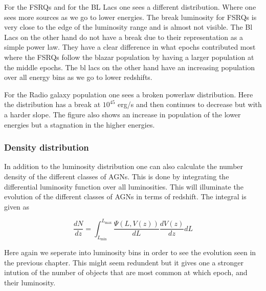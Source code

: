 \documentclass{article}
\begin{document}
For the FSRQs and for the BL Lacs one sees a different distribution. Where one sees more sources as we go to lower energies. The break luminosity for FSRQs 
is very close to the edge of the luminosity range and is almost not visible. The Bl Lacs on the other hand do not have a break 
due to their representation as a simple power law. They have a clear difference in what epochs contributed most where the FSRQs follow the blazar population by having a larger population at the 
middle epochs. The bl lacs on the other hand have an increasing population over all energy bins as we go to lower redshifts.

For the Radio galaxy population one sees a broken powerlaw distribution. Here the distribution has a break at $10^{45}$ erg/s and then continues to 
decrease but with a harder slope. The figure also shows an increase in population of the lower energies but a stagnation in the higher energies. 


\subsubsection{Density distribution}

In addition to the luminosity distribution one can also calculate the number density of the different classes of AGNs. This is done by integrating the
differential luminosity function over all luminosities. This will illuminate the evolution of the different classes of AGNs in terms of redshift. The integral is given as

\begin{equation}
    \frac{dN}{dz} = \int_{L_{\text{min}}}^{L_{\text{max}}} \frac{\Psi(L, V(z))}{dL} \frac{dV(z)}{dz} dL
\end{equation}

Here again we seperate into luminosity bins in order to see the evolution seen in the previous chapter. This might seem redundent but
it gives one a stronger intution of the number of objects that are most common at which epoch, and their luminosity. 
\end{document}
